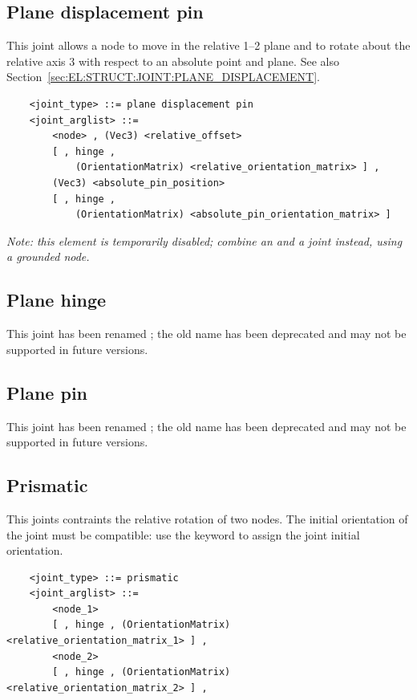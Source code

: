 \subsection{Plane displacement pin}
This joint allows a node to move in the relative 1--2 plane 
and to rotate about the relative axis 3 with respect to an absolute point 
and plane.
See also Section~\ref{sec:EL:STRUCT:JOINT:PLANE_DISPLACEMENT}.
\begin{verbatim}
    <joint_type> ::= plane displacement pin
    <joint_arglist> ::= 
        <node> , (Vec3) <relative_offset>
        [ , hinge , 
            (OrientationMatrix) <relative_orientation_matrix> ] ,
        (Vec3) <absolute_pin_position>
        [ , hinge , 
            (OrientationMatrix) <absolute_pin_orientation_matrix> ]
\end{verbatim}
\emph{Note: this element is temporarily disabled;
combine an  and a  joint instead,
using a grounded node.}


\subsection{Plane hinge}
This joint has been renamed ; the old name has been
deprecated and may not be supported in future versions.

\subsection{Plane pin}
This joint has been renamed ; the old name has been
deprecated and may not be supported in future versions.

\subsection{Prismatic}
This joints contraints the relative rotation
of two nodes. The initial orientation of the joint must be
compatible: use the  keyword to assign 
the joint initial orientation.
\begin{verbatim}
    <joint_type> ::= prismatic
    <joint_arglist> ::= 
        <node_1>
        [ , hinge , (OrientationMatrix) <relative_orientation_matrix_1> ] ,
        <node_2> 
        [ , hinge , (OrientationMatrix) <relative_orientation_matrix_2> ] ,    
\end{verbatim}

